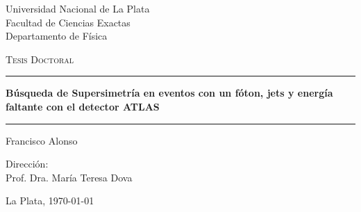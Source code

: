 \newcommand{\HRule}{\rule{\linewidth}{1pt}}

\begin{titlepage}

  \centering


    \vspace{0.5cm}

    {
      \large
      Universidad Nacional de La Plata \\
      Facultad de Ciencias Exactas \\
      Departamento de F\'isica
    }

    \vspace{1.5cm}


    \textsc{\Large Tesis Doctoral}\\[0.5cm]

    \HRule

    \vspace{0.4cm}

    {
      \huge \bfseries B\'usqueda de Supersimetr\'ia en eventos con un f\'oton,
      jets y energ\'ia faltante con el detector ATLAS\\[0.4cm]
    }

    \HRule

    \vspace{1.5cm}

    \noindent
    Francisco Alonso

    \vspace{1cm}

    Direcci\'on: \\
    Prof. Dra. Mar\'ia Teresa Dova

    \vfill

    {\large La Plata, \today}

\end{titlepage}
